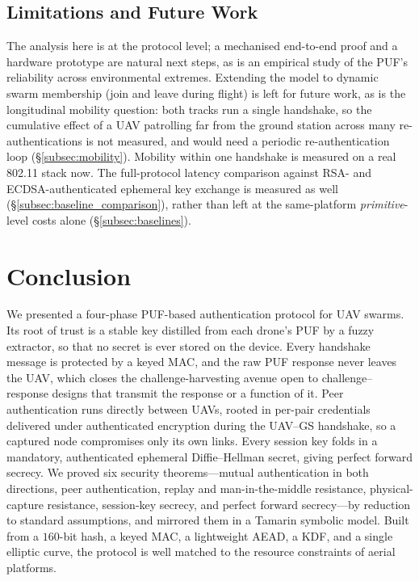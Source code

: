 \documentclass[11pt,a4paper]{article}
\begin{document}
\subsection{Limitations and Future Work}
\label{subsec:limitations}
The analysis here is at the protocol level; a mechanised end-to-end proof and a
hardware prototype are natural next steps, as is an empirical study of the PUF's
reliability across environmental extremes. Extending the model to dynamic swarm
membership (join and leave during flight) is left for future work, as is the
longitudinal mobility question: both tracks run a single handshake, so the
cumulative effect of a UAV patrolling far from the ground station across many
re-authentications is not measured, and would need a periodic
re-authentication loop (\S\ref{subsec:mobility}). Mobility within one handshake
is measured on a real 802.11 stack now. The full-protocol latency comparison
against RSA- and ECDSA-authenticated ephemeral key exchange is measured as well
(\S\ref{subsec:baseline_comparison}), rather than left at the same-platform
\emph{primitive}-level costs alone (\S\ref{subsec:baselines}).

\section{Conclusion}
\label{sec:conclusion}

We presented a four-phase PUF-based authentication protocol for UAV swarms. Its
root of trust is a stable key distilled from each drone's PUF by a fuzzy
extractor, so that no secret is ever stored on the device. Every handshake
message is protected by a keyed MAC, and the raw PUF response never leaves the
UAV, which closes the challenge-harvesting avenue open to challenge--response
designs that transmit the response or a function of it. Peer authentication runs directly between UAVs, rooted in per-pair
credentials delivered under authenticated encryption during the UAV--GS
handshake, so a captured node compromises only its own links. Every session key
folds in a mandatory, authenticated ephemeral Diffie--Hellman secret, giving
perfect forward secrecy. We proved six security theorems---mutual authentication
in both directions, peer authentication, replay and man-in-the-middle
resistance, physical-capture resistance, session-key secrecy, and perfect
forward secrecy---by reduction to standard assumptions, and mirrored them in a
Tamarin symbolic model. Built from a $160$-bit hash, a keyed MAC, a lightweight
AEAD, a KDF, and a single elliptic curve, the protocol is well matched to the
resource constraints of aerial platforms.
\end{document}
